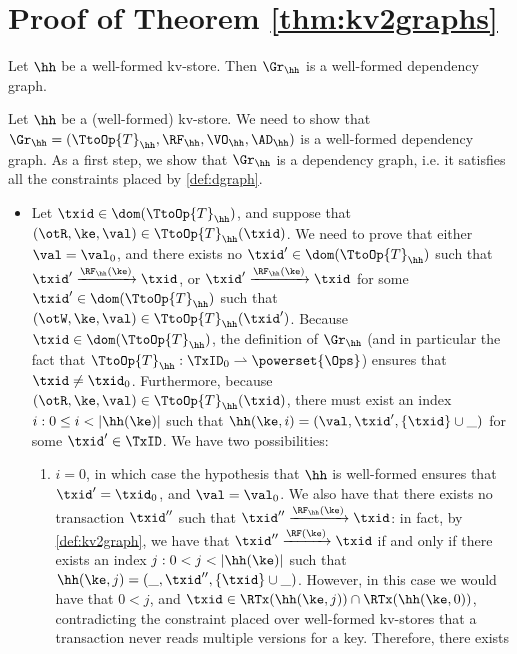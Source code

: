 \section{Proof of Theorem \ref{thm:kv2graphs}}

\begin{proposition}
Let $\hh$ be a well-formed kv-store. Then $\Gr_{\hh}$ is a well-formed dependency graph.
\end{proposition}

Let $\hh$ be a (well-formed) kv-store. We need to show that 
$\Gr_{\hh} = (\TtoOp{T}_{\hh}, \RF_{\hh}, \VO_{\hh}, \AD_{\hh})$ is a well-formed dependency graph. 
As a first step, we show that $\Gr_{\hh}$ is a dependency graph, 
i.e. it satisfies all the constraints placed by \cref{def:dgraph}.

\begin{itemize}
\item Let $\txid \in \dom(\TtoOp{T}_{\hh})$, and suppose that $(\otR, \ke, \val) \in \TtoOp{T}_{\hh}(\txid)$. 
We need to prove that either $\val = \val_{0}$, and there exists no $\txid' \in \dom(\TtoOp{T}_{\hh})$ such that 
$\txid' \xrightarrow{\RF_{\hh}(\ke)} \txid$, or $\txid' \xrightarrow{\RF_{\hh}(\ke)} \txid$ for some 
$\txid' \in \dom(\TtoOp{T}_{\hh})$ such that $(\otW, \ke, \val) \in \TtoOp{T}_{\hh}(\txid')$. 
Because $\txid \in \dom(\TtoOp{T}_{\hh})$, the definition of $\Gr_{\hh}$ (and in particular the 
fact that $\TtoOp{T}_{\hh} : \TxID_{0} \rightharpoonup \powerset{\Ops}$) ensures that 
$\txid \neq \txid_0$. Furthermore, because $(\otR, \ke, \val) \in \TtoOp{T}_{\hh}(\txid)$, there 
must exist an index $i: 0 \leq i < \lvert \hh(\ke) \rvert$ such that $\hh(\ke, i) = (\val, \txid', \{\txid \} \cup \_ )$ 
for some $\txid' \in \TxID$. 
We have two possibilities: 
\begin{enumerate}
\item $i = 0$, in which case the hypothesis that $\hh$ is well-formed ensures that $\txid' = \txid_0$, 
and $\val = \val_0$. We also have that there exists no transaction $\txid''$ such that $\txid'' \xrightarrow{\RF_{\hh}(\ke)} \txid$: 
in fact, by \cref{def:kv2graph}, we have that $\txid'' \xrightarrow{\RF(\ke)} \txid$ if and only if there exists an index 
$j: 0 < j < \lvert \hh(\ke) \rvert$ such that $\hh(\ke, j) = (\_, \txid'', \{\txid\} \cup \_)$. However, in this case we would 
have that $0 < j$, and $\txid \in \RTx(\hh(\ke, j)) \cap \RTx(\hh(\ke, 0))$, contradicting the constraint placed 
over well-formed kv-stores that a transaction never reads multiple versions for a key. Therefore, there exists 

\end{enumerate}
\end{itemize}
